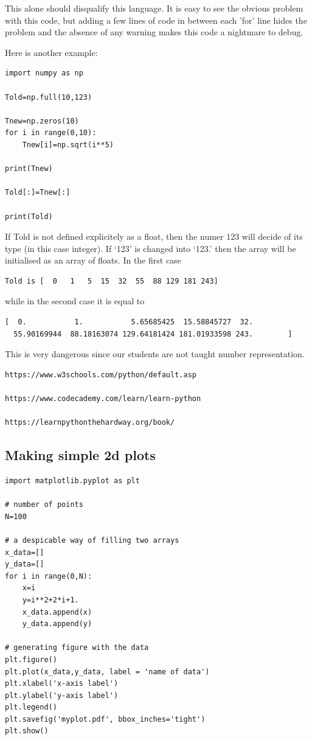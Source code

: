 This alone should disqualify this language. It is easy to see the obvious problem with this code, but adding a few lines of code in between each 'for' line hides the problem and the absence of any warning makes this code a nightmare to debug.

Here is another example:

\begin{lstlisting}
import numpy as np

Told=np.full(10,123)

Tnew=np.zeros(10)
for i in range(0,10):
    Tnew[i]=np.sqrt(i**5)

print(Tnew)

Told[:]=Tnew[:]

print(Told)
\end{lstlisting}
If Told is not defined explicitely as a float, then the 
numer 123 will decide of its type (in this case 
integer). If `123' is changed into `123.' then the 
array will be initialised as an array of floats.
In the first case 
\begin{verbatim}
Told is [  0   1   5  15  32  55  88 129 181 243]
\end{verbatim}
while in the second case it is equal to 
\begin{verbatim}
[  0.           1.           5.65685425  15.58845727  32.
  55.90169944  88.18163074 129.64181424 181.01933598 243.        ] 
\end{verbatim}
This is very dangerous since our students are not taught 
number representation.

\begin{verbatim}
https://www.w3schools.com/python/default.asp

https://www.codecademy.com/learn/learn-python

https://learnpythonthehardway.org/book/
\end{verbatim}

\subsection{Making simple 2d plots}

\begin{lstlisting}
import matplotlib.pyplot as plt

# number of points
N=100

# a despicable way of filling two arrays
x_data=[]
y_data=[]
for i in range(0,N):
    x=i
    y=i**2+2*i+1.
    x_data.append(x)
    y_data.append(y)

# generating figure with the data
plt.figure()
plt.plot(x_data,y_data, label = 'name of data')
plt.xlabel('x-axis label')
plt.ylabel('y-axis label')
plt.legend()
plt.savefig('myplot.pdf', bbox_inches='tight')
plt.show()
\end{lstlisting}

